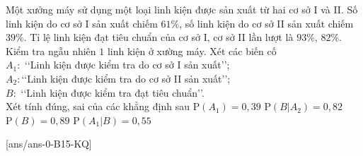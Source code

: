\begin{ex}%
	Một xưởng máy sử dụng một loại linh kiện được sản xuất từ hai cơ sở I và II. Số linh kiện do cơ sở I sản xuất chiếm $61 \%$, số linh kiện do cơ sở II sản xuất chiếm $39 \%$. Tỉ lệ linh kiện đạt tiêu chuẩn của cơ sở I, cơ sở II lần lượt là $93 \%$, $82 \%$. Kiểm tra ngẫu nhiên $1$ linh kiện ở xường máy. Xét các biến cố\\
	$A_1\colon$ \lq\lq Linh kiện được kiểm tra do cơ sở I sản xuất\rq\rq;\\
	$A_2\colon$\lq\lq Linh kiện được kiểm tra do cơ sở II sản xuất\rq\rq;\\
	$B\colon$ \lq\lq Linh kiện được kiểm tra đạt tiêu chuẩn\rq\rq.\\
	Xét tính đúng, sai của các khẳng định sau
	\choiceTF
	{$\mathrm{P}\left(A_1\right)=0{,}39$} 
	{\True $\mathrm{P}\left(B | A_2\right)=0{,}82$}
	{$\mathrm{P}(B)=0{,}89$}
	{\True $\mathrm{P}\left(A_1 | B\right)=0{,}55$}
\end{ex}
[ans/ans-0-B15-KQ]
\caukq
